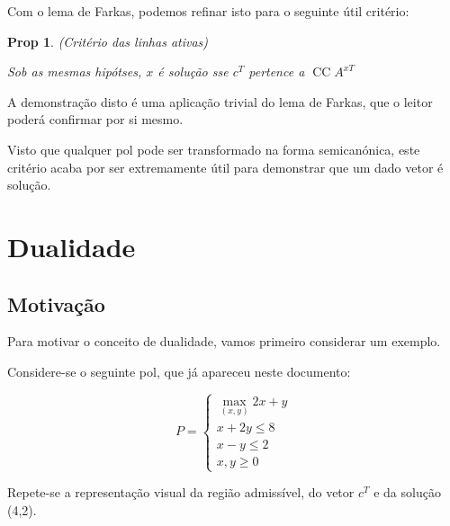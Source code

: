\documentclass{article}
\DeclareMathOperator{\CC}{CC}
\newtheorem{prop}{Prop}
\theoremstyle{definition}
\begin{document}
	Com o lema de Farkas, podemos refinar isto para o seguinte útil critério:
	
	\begin{prop} (Critério das linhas ativas)
	
	Sob as mesmas hipótses, $x$ é solução sse $c^T$ pertence a $\CC A^{xT}$
	\end{prop}
	
	A demonstração disto é uma aplicação trivial do lema de Farkas, que o leitor poderá confirmar por si mesmo.
	
	Visto que qualquer pol pode ser transformado na forma semicanónica, este critério acaba por ser extremamente útil para demonstrar que um dado vetor é solução.
	
	\section{Dualidade}
	
	\subsection{Motivação}
	
	Para motivar o conceito de dualidade, vamos primeiro considerar um exemplo.
	
	Considere-se o seguinte pol, que já apareceu neste documento:
	
	
	\[
	P =
	\begin{cases}
	\max\limits_{(x,y)} 2x + y\\
	x + 2y \leq 8\\
	x - y \leq 2 \\
	x, y \geq 0
	\end{cases}
	\]
	
	Repete-se a representação visual da região admissível, do vetor $c^T$ e da solução (4,2).
	
	
\end{document}
